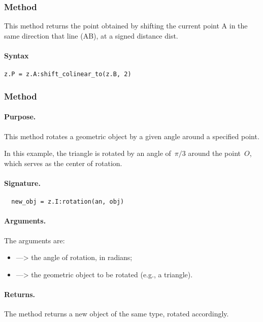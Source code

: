\subsubsection{Method }\label{shift_colinear}
This method returns the point obtained by shifting the current point
A in the same direction  that line (AB), at a signed distance dist.

\paragraph*{Syntax}\begin{verbatim}
z.P = z.A:shift_colinear_to(z.B, 2)
\end{verbatim}

\subsubsection{Method }
\label{ssub:object_rotation}

\paragraph{Purpose.}
This method rotates a geometric object by a given angle around a specified point.

\medskip
\noindent
In this example, the triangle is rotated by an angle of~$\pi/3$ around the point~$O$, which serves as the center of rotation.

\medskip
\noindent
\paragraph{Signature.}
\begin{verbatim}
  new_obj = z.I:rotation(an, obj)
\end{verbatim}

\medskip
\noindent
\paragraph{Arguments.}
The arguments are:
\begin{itemize}
  \item {} —> the angle of rotation, in radians;
  \item {} —> the geometric object to be rotated (e.g., a triangle).
\end{itemize}

\medskip
\noindent
\paragraph{Returns.}
The method returns a new object of the same type, rotated accordingly.

